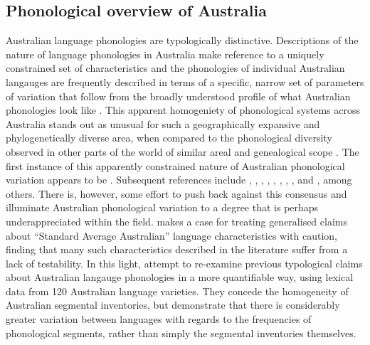 \hypertarget{phonological-overview-of-australia}{%
\subsection{Phonological overview of Australia}\label{phonological-overview-of-australia}}

Australian language phonologies are typologically distinctive. Descriptions of the nature of language phonologies in Australia make reference to a uniquely constrained set of characteristics and the phonologies of individual Australian langauges are frequently described in terms of a specific, narrow set of parameters of variation that follow from the broadly understood profile of what Australian phonologies look like \autocites[e.g.][p.~11]{goddard_grammar_1985}[p.~52]{evans_grammar_1995}[p.~7]{breen_grammar_2007}[p.~23]{gaby_grammar_2006}. This apparent homogeniety of phonological systems across Australia stands out as unusual for such a geographically expansive and phylogenetically diverse area, when compared to the phonological diversity observed in other parts of the world of similar areal and genealogical scope \autocites{maddieson_patterns_1984}{mielke_emergence_2008}. The first instance of this apparently constrained nature of Australian phonological variation appears to be \textcite{schmidt_gliederung_1919}. Subsequent references include \textcite{capell_new_1956}, \textcite{voegelin_obtaining_1963}, \textcite{dixon_languages_1980}, \textcite{busby_distribution_1982}, \textcite{hamilton_phonetic_1996}, \textcite{butcher_australian_2006}, \textcite{dixon_australian_2002}, \textcite{baker_word_2014}, and \textcite{round_segment_2021}, among others. There is, however, some effort to push back against this consensus and illuminate Australian phonological variation to a degree that is perhaps underappreciated within the field. \textcite{bowern_standard_2017} makes a case for treating generalised claims about ``Standard Average Australian'' language characteristics with caution, finding that many such characteristics described in the literature suffer from a lack of testability. In this light, \textcite{gasser_revisiting_2014} attempt to re-examine previous typological claims about Australian langauge phonologies in a more quantifiable way, using lexical data from 120 Australian language varieties. They concede the homogeneity of Australian segmental inventories, but demonstrate that there is considerably greater variation between languages with regards to the frequencies of phonological segments, rather than simply the segmental inventories themselves.

